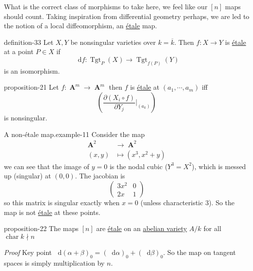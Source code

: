 \documentclass[10pt,]{book}
\makeatletter
\renewcommand*{\proofname}{Proof}
\renewenvironment{proof}[1][\proofname]{\par
  \pushQED{\qed}%
  \normalfont \topsep6\p@\@plus6\p@\relax
  \trivlist
  \item\relax
    {\itshape
    #1\@addpunct{.}}\hspace\labelsep\ignorespaces
}{%
  \popQED\endtrivlist\@endpefalse
}
\numberwithin{equation}{section}
\newcommand{\diff}{\mathop{}\!\mathrm{d}}
\newcommand{\lb}{[}
\newcommand{\rb}{]}
\DeclareMathOperator{\Tgt}{Tgt}
\DeclareMathOperator{\characteristic}{char}
\DeclareMathOperator{\aff}{\mathbf{A}}
\newcommand{\amp}{&}
\makeatother
\begin{document}
\par
\hypertarget{p-270}{}%
What is the correct class of morphisms to take here, we feel like our \(\lb n\rb\) maps should count. Taking inspiration from differential geometry perhaps, we are led to the notion of a local diffeomorphism, an \hyperref[def-etale]{étale} map.%
\begin{definition}{}{definition-33}%
\hypertarget{p-271}{}%
Let \(X,Y\) be nonsingular varieties over \(k = \overline k\). Then \(f\colon X\to Y\) is \hyperref[def-etale]{étale} at a point \(P\in X\) if%
\begin{equation*}
\diff f\colon\Tgt_{P}(X) \to \Tgt_{f(P)} (Y)
\end{equation*}
is an isomorphism.%
\end{definition}
\begin{proposition}{}{}{proposition-21}%
\hypertarget{p-272}{}%
Let \(f \colon \aff^m\to \aff^m\) then \(f\) is \hyperref[def-etale]{étale} at \((a_1, \cdots, a_m)\) iff%
\begin{equation*}
\left(\frac{\partial(X_i \circ f)}{\partial Y_j}|_{(a_k)} \right)
\end{equation*}
is nonsingular.%
\end{proposition}
\begin{example}{A non-étale map.}{example-11}%
\hypertarget{p-273}{}%
Consider the map%
\begin{align*}
\aff^2 \amp\to \aff^2\\
(x,y) \amp\mapsto (x^3, x^2 + y)
\end{align*}
we can see that the image of \(y= 0\) is the nodal cubic (\(Y^3 = X^2\)), which is messed up (singular) at \((0,0)\). The jacobian is%
\begin{equation*}
\begin{pmatrix} 3x^2 \amp 0 \\ 2x \amp 1\end{pmatrix}
\end{equation*}
so this matrix is singular exactly when \(x= 0\) (unless characteristic 3). So the map is not \hyperref[def-etale]{étale} at these points.%
\end{example}
\begin{proposition}{}{}{proposition-22}%
\hypertarget{p-274}{}%
The maps \(\lb n\rb\) are \hyperref[def-etale]{étale} on an \hyperref[def-buntes-abvar]{abelian variety} \(A/k\) for all  \(\characteristic{k} \nmid n\)%
\end{proposition}
\begin{proof}\hypertarget{proof-46}{}
\hypertarget{p-275}{}%
Key point \(\diff (\alpha+ \beta)_0 = (\diff \alpha )_0 + (\diff \beta)_0\). So the map on tangent spaces is simply multiplication by \(n\).%
\end{proof}
\end{document}
